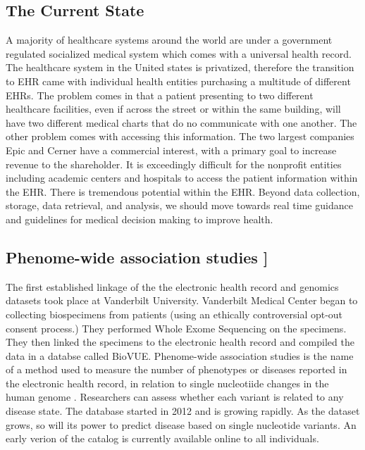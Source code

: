 \documentclass[sigconf]{acmart}
\begin{document}
\subsection{	The Current State}

A majority of healthcare systems around the world are under a
government regulated socialized medical system which comes with a
universal health record. The healthcare system in the United states is
privatized, therefore the transition to EHR came with individual
health entities purchasing a multitude of different EHRs.  The problem
comes in that a patient presenting to two different healthcare
facilities, even if across the street or within the same building,
will have two different medical charts that do no communicate with one
another.  The other problem comes with accessing this information.
The two largest companies Epic and Cerner have a commercial interest,
with a primary goal to increase revenue to the shareholder.  It is
exceedingly difficult for the nonprofit entities including academic
centers and hospitals to access the patient information within the
EHR. There is tremendous potential within the EHR.  Beyond data
collection, storage, data retrieval, and analysis, we should move
towards real time guidance and guidelines for medical decision making
to improve health.

\subsection{Phenome-wide association studies ]}
 The first established linkage of the the electronic health record and genomics datasets took place at Vanderbilt University.  Vanderbilt Medical Center began to collecting biospecimens from patients (using an ethically controversial opt-out consent process.)  They performed Whole Exome Sequencing on the specimens.  They then linked the specimens to the electronic health record and compiled the data in a databse called BioVUE. Phenome-wide association studies is the name of a method used to measure the number of phenotypes or diseases reported in the electronic health record, in relation to single nucleotiide changes in the human genome \cite{denny2010phewas}.  Researchers can assess whether each variant is related to any disease state.  The database started in 2012 and is growing rapidly.  As the dataset grows, so will its power to predict disease based on single nucleotide variants.  An early verion of the catalog is currently available online to all individuals.     
  
\end{document}
